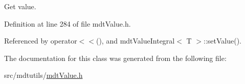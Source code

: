 Get value. 



Definition at line 284 of file mdt\-Value.\-h.



Referenced by operator$<$$<$(), and mdt\-Value\-Integral$<$ T $>$\-::set\-Value().



The documentation for this class was generated from the following file\-:\begin{DoxyCompactItemize}
\item 
src/mdtutils/\hyperlink{mdt_value_8h}{mdt\-Value.\-h}\end{DoxyCompactItemize}
